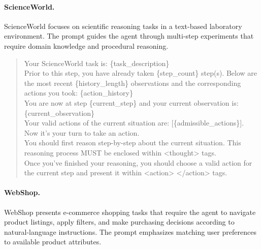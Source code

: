\documentclass[11pt]{article}
\begin{document}
\paragraph{ScienceWorld.}
ScienceWorld focuses on scientific reasoning tasks in a text-based laboratory environment. The prompt guides the agent through multi-step experiments that require domain knowledge and procedural reasoning.

\begin{quote}
\small\ttfamily
Your ScienceWorld task is: \{task\_description\}\\[2pt]
Prior to this step, you have already taken \{step\_count\} step(s). Below are the most recent \{history\_length\} observations and the corresponding actions you took: \{action\_history\}\\[2pt]
You are now at step \{current\_step\} and your current observation is: \{current\_observation\}\\[2pt]
Your valid actions of the current situation are: [\{admissible\_actions\}].\\[6pt]
Now it's your turn to take an action.\\[2pt]
You should first reason step-by-step about the current situation. This reasoning process MUST be enclosed within <thought> tags.\\[2pt]
Once you've finished your reasoning, you should choose a valid action for the current step and present it within <action> </action> tags.
\end{quote}

\paragraph{WebShop.}
WebShop presents e-commerce shopping tasks that require the agent to navigate product listings, apply filters, and make purchasing decisions according to natural-language instructions. The prompt emphasizes matching user preferences to available product attributes.
\end{document}
